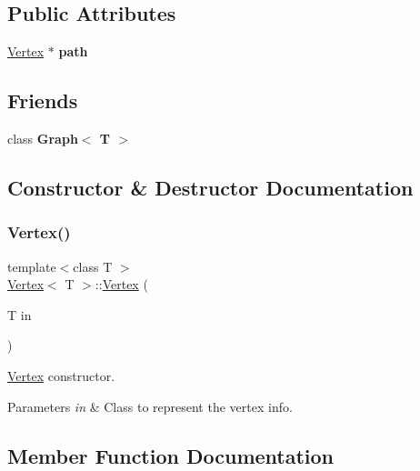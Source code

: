 \subsection*{Public Attributes}
\begin{DoxyCompactItemize}
\item 
\mbox{\label{class_vertex_abd40febd917aa25add6bd42237c8463a}} 
\hyperlink{class_vertex}{Vertex} $\ast$ {\bfseries path}
\end{DoxyCompactItemize}
\subsection*{Friends}
\begin{DoxyCompactItemize}
\item 
\mbox{\label{class_vertex_aefa9b76cd57411c5354e5620dc2d84dd}} 
class {\bfseries Graph$<$ T $>$}
\end{DoxyCompactItemize}


\subsection{Constructor \& Destructor Documentation}
\mbox{\label{class_vertex_afcbdd4d4198b672356559cb8fa088408}} 
\subsubsection{\texorpdfstring{Vertex()}{Vertex()}}
{\footnotesize\ttfamily template$<$class T $>$ \\
\hyperlink{class_vertex}{Vertex}$<$ T $>$\+::\hyperlink{class_vertex}{Vertex} (\begin{DoxyParamCaption}\item[{T}]{in }\end{DoxyParamCaption})}

\hyperlink{class_vertex}{Vertex} constructor. 
\begin{DoxyParams}{Parameters}
{\em in} & Class to represent the vertex info. \\
\hline
\end{DoxyParams}


\subsection{Member Function Documentation}
\mbox{\label{class_vertex_a0c7f0692945984cc656e28d2a2044e3c}} 
